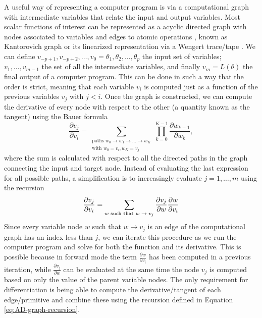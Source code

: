 A useful way of representing a computer program is via a computational graph with intermediate variables that relate the input and output variables. 
Most scalar functions of interest can be represented as a acyclic directed graph with nodes associated to variables and edges to atomic operations \cite{Griewank:2008kh, Griewank_1989}, known as Kantorovich graph \cite{kantorovich1957mathematical} or its linearized representation via a Wengert trace/tape \cite{Wengert_1964, Bauer_1974, Griewank:2008kh}. 
We can define $v_{-p+1}, v_{-p+2}, \ldots, v_0 = \theta_1, \theta_2, \ldots, \theta_p$ the input set of variables; $v_{1}, \ldots, v_{m-1}$ the set of all the intermediate variables, and finally $v_m = L(\theta)$ the final output of a computer program. 
This can be done in such a way that the order is strict, meaning that each variable $v_i$ is computed just as a function of the previous variables $v_j$ with $j < i$. 
Once the graph is constructed, we can compute the derivative of every node with respect to the other (a quantity known as the tangent) using the Bauer formula \cite{Bauer_1974, Oktay_randomized-AD}
\begin{equation}
    \frac{\partial v_j}{\partial v_i}
    = 
    \sum_{\substack{ \text{paths }w_0 \rightarrow w_1 \rightarrow \ldots \rightarrow w_K \\
                    \text{with } w_0=v_i, w_K = v_j}}
    \prod_{k=0}^{K-1} \frac{\partial w_{k+1}}{\partial w_{k}},
\end{equation}
where the sum is calculated with respect to all the directed paths in the graph connecting the input and target node.
Instead of evaluating the last expression for all possible paths, a simplification is to increasingly evaluate $j=1, \ldots, m$ using the recursion 
\begin{equation}
    \frac{\partial v_j}{\partial v_i}
    = 
    \sum_\text{$w$\text{ such that} $w \rightarrow v_j$}
    \frac{\partial v_j}{\partial w}
    \frac{\partial w}{\partial v_i} 
    \label{eq:AD-graph-recursion}
\end{equation}
Since every variable node $w$ such that $w \rightarrow v_j$ is an edge of the computational graph has an index less than $j$, we can iterate this procedure as we run the computer program and solve for both the function and its derivative.
This is possible because in forward mode the term $\frac{\partial w}{\partial v_i}$ has been computed in a previous iteration, while $\frac{\partial v_j}{\partial w}$ can be evaluated at the same time the node $v_j$ is computed based on only the value of the parent variable nodes. 
The only requirement for differentiation is being able to compute the derivative/tangent of each edge/primitive and combine these using the recursion defined in Equation \eqref{eq:AD-graph-recursion}.

